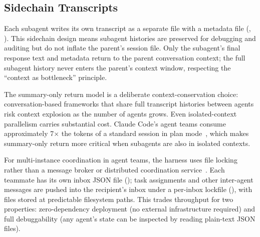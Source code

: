 \subsection{Sidechain Transcripts}
\label{sec:subagent:sidechain}

Each subagent writes its own transcript as a separate  file with a  metadata file (, ). This sidechain design means subagent histories are preserved for debugging and auditing but do not inflate the parent's session file. Only the subagent's final response text and metadata return to the parent conversation context; the full subagent history never enters the parent's context window, respecting the ``context as bottleneck'' principle.

The summary-only return model is a deliberate context-conservation choice: conversation-based frameworks that share full transcript histories between agents risk context explosion as the number of agents grows. Even isolated-context parallelism carries substantial cost. Claude Code's agent teams consume approximately 7$\times$ the tokens of a standard session in plan mode~\citep{anthropic2025agentteams}, which makes summary-only return more critical when subagents are also in isolated contexts.

For multi-instance coordination in agent teams, the harness uses file locking rather than a message broker or distributed coordination service~\citep{anthropic2025agentteams}. Each teammate has its own inbox JSON file (); task assignments and other inter-agent messages are pushed into the recipient's inbox under a per-inbox lockfile (), with files stored at predictable filesystem paths. This trades throughput for two properties: zero-dependency deployment (no external infrastructure required) and full debuggability (any agent's state can be inspected by reading plain-text JSON files).

